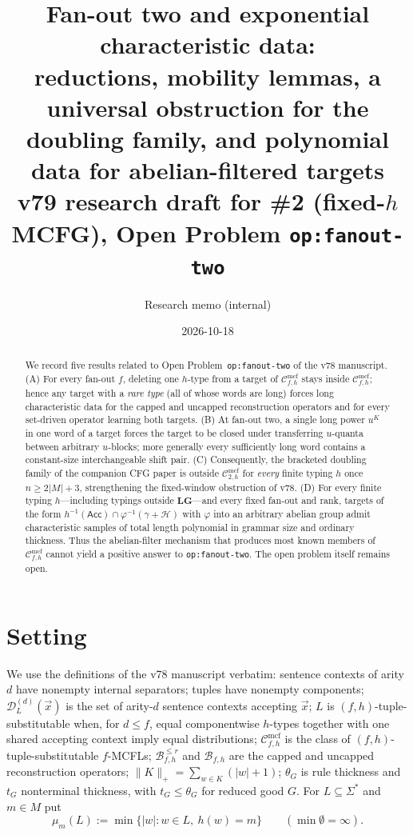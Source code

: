 \documentclass[11pt]{article}
\title{Fan-out two and exponential characteristic data:\\
reductions, mobility lemmas, a universal obstruction for the doubling
family, and polynomial data for abelian-filtered targets\\[4pt]
\large v79 research draft for \#2 (fixed-$h$ MCFG), Open Problem
\texttt{op:fanout-two}}
\author{Research memo (internal)}
\date{2026-10-18}
\theoremstyle{definition}
\theoremstyle{remark}
\newcommand{\Cmcf}[2]{\mathcal{C}^{\mathrm{mcf}}_{#1,#2}}
\newcommand{\D}{\mathcal{D}}
\newcommand{\tuple}[1]{\vec{#1}}
\newcommand{\B}{\mathcal B}
\begin{document}
\maketitle

\begin{abstract}
We record five results related to Open Problem~\texttt{op:fanout-two}
of the v78 manuscript.  (A) For every fan-out $f$, deleting one
$h$-type from a target of $\Cmcf{f}{h}$ stays inside $\Cmcf{f}{h}$; hence
any target with a \emph{rare type} (all of whose words are long) forces
long characteristic data for the capped and uncapped reconstruction
operators and for every set-driven operator learning both targets.
(B) At fan-out two, a single long power $u^{K}$ in one word of a target
forces the target to be closed under transferring $u$-quanta between
arbitrary $u$-blocks; more generally every sufficiently long word
contains a constant-size interchangeable shift pair.  (C) Consequently,
the bracketed doubling family of the companion CFG paper is outside
$\Cmcf{2}{h}$ for \emph{every} finite typing $h$ once
$n\ge 2|M|+3$, strengthening the fixed-window obstruction of v78.
(D) For every finite typing $h$---including typings outside
$\mathbf{LG}$---and every fixed fan-out and rank, targets of the form
$h^{-1}(\mathsf{Acc})\cap\varphi^{-1}(\gamma+\mathcal H)$ with
$\varphi$ into an arbitrary abelian group admit characteristic samples of
total length polynomial in grammar size and ordinary thickness.  Thus the
abelian-filter mechanism that produces most known members of
$\Cmcf{f}{h}$ cannot yield a positive answer to \texttt{op:fanout-two}.
The open problem itself remains open.
\end{abstract}

\section{Setting}
We use the definitions of the v78 manuscript verbatim: sentence contexts
of arity $d$ have nonempty internal separators; tuples have nonempty
components; $\D_L^{(d)}(\tuple x)$ is the set of arity-$d$ sentence
contexts accepting $\tuple x$; $L$ is $(f,h)$-tuple-substitutable when,
for $d\le f$, equal componentwise $h$-types together with one shared
accepting context imply equal distributions; $\Cmcf{f}{h}$ is the class of
$(f,h)$-tuple-substitutable $f$-MCFLs; $\B^{\le r}_{f,h}$ and $\B_{f,h}$
are the capped and uncapped reconstruction operators;
$\|K\|_+=\sum_{w\in K}(|w|+1)$; $\theta_G$ is rule thickness and $t_G$
nonterminal thickness, with $t_G\le\theta_G$ for reduced good $G$.
For $L\subseteq\Sigma^*$ and $m\in M$ put
\[
 \mu_m(L):=\min\{|w|:w\in L,\ h(w)=m\}\qquad(\min\emptyset=\infty).
\]
\end{document}
